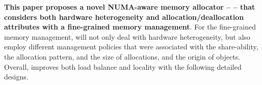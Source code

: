 
\textbf{This paper proposes a novel NUMA-aware memory allocator -- \NM{} -- that considers both hardware heterogeneity and allocation/deallocation attributes with a fine-grained memory management}. For the fine-grained memory management, \NM{} will not only deal with hardware heterogeneity, but also employ different management policies that were associated with the share-ability, the allocation pattern, and the size of allocations, and the origin of objects. Overall, \NM{} improves both load balance and locality with the following detailed designs.  


